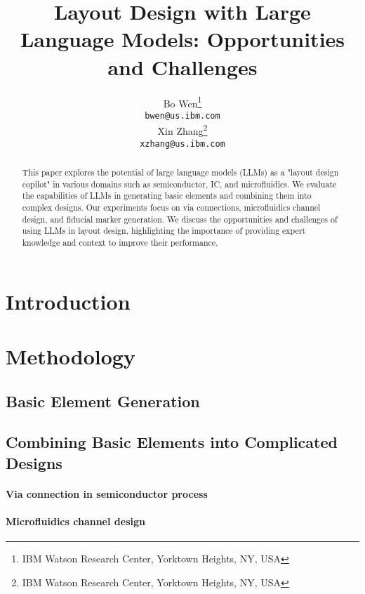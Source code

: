 \documentclass{article}
\title{Layout Design with Large Language Models: Opportunities and Challenges}
\author{%
  Bo Wen\thanks{IBM Watson Research Center, Yorktown Heights, NY, USA} \\
  \texttt{bwen@us.ibm.com} \\
  \And
  Xin Zhang\thanks{IBM Watson Research Center, Yorktown Heights, NY, USA} \\
  \texttt{xzhang@us.ibm.com} \\
}
\begin{document}
\maketitle

\begin{abstract}
  This paper explores the potential of large language models (LLMs) as a "layout design copilot" in various domains such as semiconductor, IC, and microfluidics. We evaluate the capabilities of LLMs in generating basic elements and combining them into complex designs. Our experiments focus on via connections, microfluidics channel design, and fiducial marker generation. We discuss the opportunities and challenges of using LLMs in layout design, highlighting the importance of providing expert knowledge and context to improve their performance.
\end{abstract}

\section{Introduction}

\section{Methodology}
\subsection{Basic Element Generation}

\subsection{Combining Basic Elements into Complicated Designs}
\paragraph{Via connection in semiconductor process}
\paragraph{Microfluidics channel design}
\end{document}

